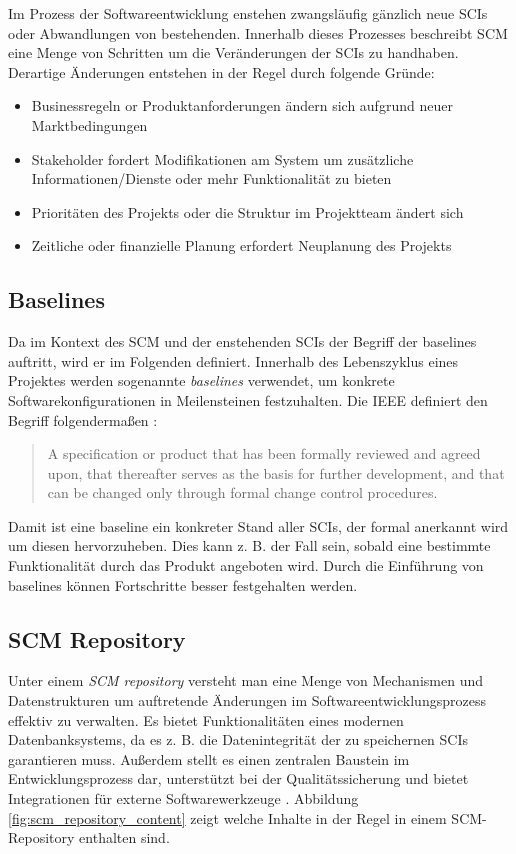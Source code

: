 \documentclass[runningheads,a4paper]{uwsese}
\begin{document}
Im Prozess der Softwareentwicklung enstehen zwangsläufig gänzlich neue SCIs oder
Abwandlungen von bestehenden.
Innerhalb dieses Prozesses beschreibt SCM eine Menge von Schritten um die
Veränderungen der SCIs zu handhaben. Derartige Änderungen entstehen in
der Regel durch folgende Gründe:

\begin{itemize}
	\item Businessregeln or Produktanforderungen ändern sich aufgrund neuer Marktbedingungen
	\item Stakeholder fordert Modifikationen am System um zusätzliche Informationen/Dienste
        oder mehr Funktionalität zu bieten
	\item Prioritäten des Projekts oder die Struktur im Projektteam ändert sich
	\item Zeitliche oder finanzielle Planung erfordert Neuplanung des Projekts
\end{itemize}

\subsection{Baselines}
Da im Kontext des SCM und der enstehenden SCIs der Begriff der baselines auftritt,
wird er im Folgenden definiert.
Innerhalb des Lebenszyklus eines Projektes werden sogenannte {\em baselines}
verwendet, um konkrete Softwarekonfigurationen in Meilensteinen festzuhalten.
Die IEEE definiert den Begriff folgendermaßen \cite[p. 588]{Pressman:2009:SEP:1593949}:

\begin{quote}
  A specification or product that has been formally reviewed and agreed upon,
  that thereafter serves as the basis for further development, and that can be
  changed only through formal change control procedures.
\end{quote}

Damit ist eine baseline ein konkreter Stand aller SCIs, der formal anerkannt
wird um diesen hervorzuheben. Dies kann z. B. der Fall sein, sobald eine bestimmte
Funktionalität durch das Produkt angeboten wird. Durch die Einführung von baselines
können Fortschritte besser festgehalten werden.

\subsection{SCM Repository}
Unter einem {\em SCM repository} versteht man eine Menge von Mechanismen und
Datenstrukturen um auftretende Änderungen im Softwareentwicklungsprozess
effektiv zu verwalten. Es bietet Funktionalitäten eines modernen Datenbanksystems,
da es z. B. die Datenintegrität der zu speichernen SCIs garantieren muss.
Außerdem stellt es einen zentralen Baustein im Entwicklungsprozess dar, unterstützt
bei der Qualitätssicherung und bietet Integrationen für externe Softwarewerkzeuge
\cite[p. 590f]{Pressman:2009:SEP:1593949}. Abbildung \ref{fig:scm_repository_content}
zeigt welche Inhalte in der Regel in einem SCM-Repository enthalten sind.
\end{document}
